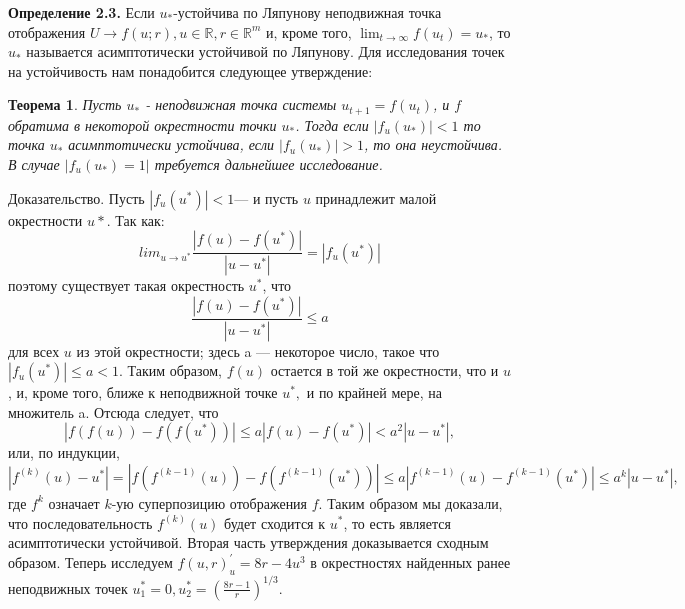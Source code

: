 \documentclass[11pt]{article}
\begin{document}
	{\hspace*{-0.8cm} \textbf{Определение 2.3.} Если $u_*$-устойчива по Ляпунову неподвижная точка отображения $U \rightarrow f(u;r), u \in \mathds{R}, r \in \mathds{R}^m$ и, кроме того, $\lim_{t\to\infty} f(u_t) = u_*$, то $u_*$ называется асимптотически устойчивой по Ляпунову.}
	\newline
	{Для исследования точек на устойчивость нам понадобится следующее утверждение:}
	\newline
	\newtheorem{theorem}{Теорема}
	\begin{theorem}
		{Пусть $u_*$ - неподвижная точка системы $u_{t+1} = f(u_t)$, и $f$ обратима в некоторой окрестности точки $u_*$. Тогда если $|f_u(u_*)| < 1$ то точка $u_*$ асимптотически устойчива, если $|f_u(u_*)| > 1$, то она неустойчива. В случае $|f_u(u_*) = 1|$ требуется дальнейшее исследование.}
	\end{theorem}
	{Доказательство. Пусть $|f_u(u^*)| < 1$--- и пусть $u$ принадлежит малой окрестности $u*$. Так как:}
	\[lim_{u \to u^*} \frac{|f(u) - f(u^*)|}{|u - u^*|} = |f_u(u^*)|\]
	{поэтому существует такая окрестность $u^*$, что}
	\[ \frac{|f(u) - f(u^*)|}{|u - u^*|} \leq a \]
	{для всех $u$ из этой окрестности; здесь a --- некоторое число, такое что $|f_u(u^*)| \leq a < 1.$ Таким образом, $f(u)$ остается в той же окрестности, что и $u$, и, кроме того, ближе к неподвижной точке $u^*,$ и по крайней мере, на множитель a. Отсюда следует, что}
	\[ |f(f(u)) - f(f(u^*))| \leq a|f(u) - f(u^*)| < a^2|u - u^*|, \]
	{или, по индукции,}
	\[ |f^{(k)}(u) - u^*| =|f(f^{(k - 1)}(u)) - f(f^{(k - 1)}(u^*))|\leq a|f^{(k - 1)}(u) - f^{(k - 1)}(u^*)| \leq a^k|u - u^*|,\]
	{где $f^k$ означает $k$-ую суперпозицию отображения $f$. Таким образом мы доказали, что последовательность $f^{(k)}(u)$  будет сходится к $u^*$, то есть является асимптотически устойчивой. Вторая часть утверждения доказывается сходным образом.}
	\newline
	\newline
	{Теперь исследуем $f(u,r)^{'}_{u} = 8r - 4u^3$ в окрестностях найденных ранее неподвижных точек $u_1^*=0,u_2^*=(\frac{8r - 1}{r})^{1/3}$.}
\end{document}
